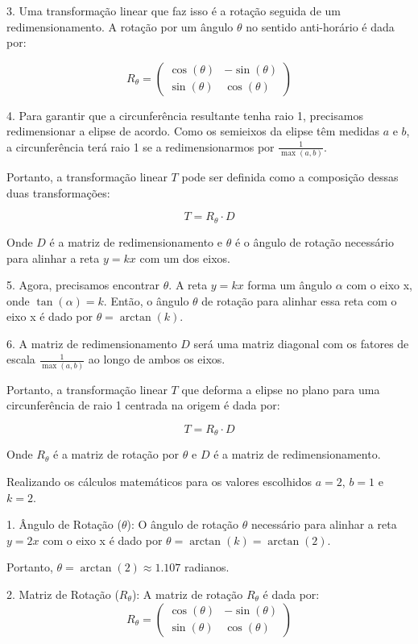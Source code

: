 3. Uma transformação linear que faz isso é a rotação seguida de um redimensionamento. A rotação por um ângulo \( \theta \) no sentido anti-horário é dada por:

\[ R_\theta = \begin{pmatrix} \cos(\theta) & -\sin(\theta) \\ \sin(\theta) & \cos(\theta) \end{pmatrix} \]

4. Para garantir que a circunferência resultante tenha raio 1, precisamos redimensionar a elipse de acordo. Como os semieixos da elipse têm medidas \( a \) e \( b \), a circunferência terá raio 1 se a redimensionarmos por \( \frac{1}{\max(a, b)} \).

Portanto, a transformação linear \( T \) pode ser definida como a composição dessas duas transformações:

\[ T = R_{\theta} \cdot D \]

Onde \( D \) é a matriz de redimensionamento e \( \theta \) é o ângulo de rotação necessário para alinhar a reta \( y = kx \) com um dos eixos.

5. Agora, precisamos encontrar \( \theta \). A reta \( y = kx \) forma um ângulo \( \alpha \) com o eixo x, onde \( \tan(\alpha) = k \). Então, o ângulo \( \theta \) de rotação para alinhar essa reta com o eixo x é dado por \( \theta = \arctan(k) \).

6. A matriz de redimensionamento \( D \) será uma matriz diagonal com os fatores de escala \( \frac{1}{\max(a, b)} \) ao longo de ambos os eixos.

Portanto, a transformação linear \( T \) que deforma a elipse no plano para uma circunferência de raio 1 centrada na origem é dada por:

\[ T = R_{\theta} \cdot D \]

Onde \( R_{\theta} \) é a matriz de rotação por \( \theta \) e \( D \) é a matriz de redimensionamento.

Realizando os cálculos matemáticos para os valores escolhidos \( a = 2 \), \( b = 1 \) e \( k = 2 \).

1. Ângulo de Rotação (\( \theta \)):
   O ângulo de rotação \( \theta \) necessário para alinhar a reta \( y = 2x \) com o eixo x é dado por \( \theta = \arctan(k) = \arctan(2) \).

   Portanto, \( \theta = \arctan(2) \approx 1.107 \) radianos.

2. Matriz de Rotação (\( R_{\theta} \)):
   A matriz de rotação \( R_{\theta} \) é dada por:
   \[
   R_{\theta} = \begin{pmatrix} \cos(\theta) & -\sin(\theta) \\ \sin(\theta) & \cos(\theta) \end{pmatrix}
   \]


